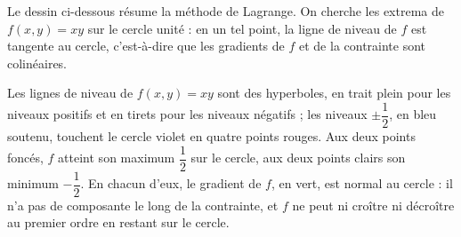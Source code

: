 \documentclass[a4paper,twoside]{report}
\newcommand{\grad}{\nabla}                        %
\begin{document}
Le dessin ci-dessous résume la méthode de Lagrange. On cherche les extrema de $f(x, y) = xy$ sur le cercle unité : en un tel point, la ligne de niveau de $f$ est tangente au cercle, c'est-à-dire que les gradients de $f$ et de la contrainte sont colinéaires.

\vfill
\noindent\begin{minipage}[c]{7.0cm}
\end{minipage}\hfill
\begin{minipage}[c]{8.6cm}
Les lignes de niveau de $f(x, y) = xy$ sont des hyperboles, en trait plein pour les niveaux positifs et en tirets pour les niveaux négatifs ; les niveaux $\pm\dfrac{1}{2}$, en bleu soutenu, touchent le cercle violet en quatre points rouges. Aux deux points foncés, $f$ atteint son maximum $\dfrac{1}{2}$ sur le cercle, aux deux points clairs son minimum $-\dfrac{1}{2}$. En chacun d'eux, le gradient de $f$, en vert, est normal au cercle : il n'a pas de composante le long de la contrainte, et $f$ ne peut ni croître ni décroître au premier ordre en restant sur le cercle.
\end{minipage}
\vfill
\newpage
\end{document}
